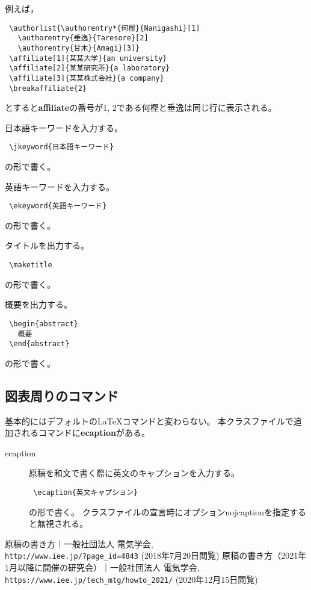 \documentclass[fleqn]{ieej-tec2}%
\newcommand{\bs}{\texttt{\symbol{'134}}}
\begin{document}
\begin{description}
例えば，
\begin{verbatim}
 \authorlist{\authorentry*{何樫}{Nanigashi}[1]
   \authorentry{垂逸}{Taresore}[2] 
   \authorentry{甘木}{Amagi}[3]}
 \affiliate[1]{某某大学}{an university}
 \affiliate[2]{某某研究所}{a laboratory}
 \affiliate[3]{某某株式会社}{a company}
 \breakaffiliate{2}        
\end{verbatim}
とすると\textbf{\bs affiliate}の番号が1, 2である何樫と垂逸は同じ行に表示される。

\item[\bs jkeyword]
日本語キーワードを入力する。
\begin{verbatim}
 \jkeyword{日本語キーワード}
\end{verbatim}
の形で書く。

\item[\bs ekeyword]
英語キーワードを入力する。
\begin{verbatim}
 \ekeyword{英語キーワード}
\end{verbatim}
の形で書く。

\item[\bs maketitle]
タイトルを出力する。
\begin{verbatim}
 \maketitle
\end{verbatim}
の形で書く。

\item[abstract環境]
概要を出力する。
\begin{verbatim}
 \begin{abstract}
   概要
 \end{abstract}
\end{verbatim}
の形で書く。

\end{description}

\subsection{図表周りのコマンド}
基本的にはデフォルトの\LaTeX コマンドと変わらない。
本クラスファイルで追加されるコマンドに\textbf{\bs ecaption}がある。

\begin{description}
\item[\bs ecaption]
原稿を和文で書く際に英文のキャプションを入力する。
\begin{verbatim}
 \ecaption{英文キャプション}
\end{verbatim}
の形で書く。
クラスファイルの宣言時にオプションnojcaptionを指定すると無視される。

\end{description}


\begin{thebibliography}{99}
原稿の書き方｜一般社団法人 電気学会, \\
\verb|http://www.iee.jp/?page_id=4843| (2018年7月20日閲覧)
原稿の書き方（2021年1月以降に開催の研究会）｜一般社団法人 電気学会, \\
\verb|https://www.iee.jp/tech_mtg/howto_2021/| (2020年12月15日閲覧)
\end{thebibliography}
\end{document}
